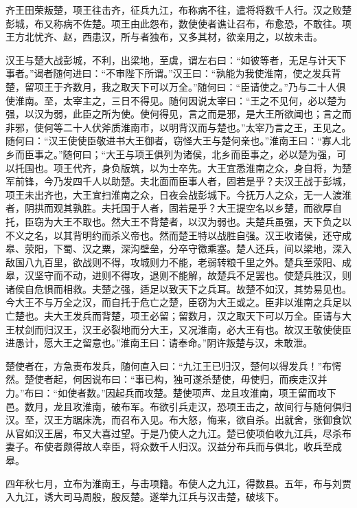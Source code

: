 \documentclass[]{article}
\begin{document}
齐王田荣叛楚，项王往击齐，征兵九江，布称病不往，遣将将数千人行。汉之败楚彭城，布又称病不佐楚。项王由此怨布，数使使者谯让召布，布愈恐，不敢往。项王方北忧齐、赵，西患汉，所与者独布，又多其材，欲亲用之，以故未击。

汉王与楚大战彭城，不利，出梁地，至虞，谓左右曰：``如彼等者，无足与计天下事者。''谒者随何进曰：``不审陛下所谓。''汉王曰：``孰能为我使淮南，使之发兵背楚，留项王于齐数月，我之取天下可以万全。''随何曰：``臣请使之。''乃与二十人俱使淮南。至，太宰主之，三日不得见。随何因说太宰曰：``王之不见何，必以楚为强，以汉为弱，此臣之所为使。使何得见，言之而是邪，是大王所欲闻也；言之而非邪，使何等二十人伏斧质淮南市，以明背汉而与楚也。''太宰乃言之王，王见之。随何曰：``汉王使使臣敬进书大王御者，窃怪大王与楚何亲也。''淮南王曰：``寡人北乡而臣事之。''随何曰；``大王与项王俱列为诸侯，北乡而臣事之，必以楚为强，可以托国也。项王代齐，身负版筑，以为士卒先。大王宜悉淮南之众，身自将，为楚军前锋，今乃发四千人以助楚。夫北面而臣事人者，固若是乎？夫汉王战于彭城，项王未出齐也，大王宜扫淮南之众，日夜会战彭城下。今抚万人之众，无一人渡淮者，阴拱而观其孰胜。夫托国于人者，固若是乎？大王提空名以乡楚，而欲厚自托，臣窃为大王不取也。然大王不背楚者，以汉为弱也。夫楚兵虽强，天下负之以不义之名，以其背明约而杀义帝也。然而楚王特以战胜自强。汉王收诸侯，还守成皋、荥阳，下蜀、汉之粟，深沟壁垒，分卒守徼乘塞。楚人还兵，间以梁地，深入敌国八九百里，欲战则不得，攻城则力不能，老弱转粮千里之外。楚兵至荥阳、成皋，汉坚守而不动，进则不得攻，退则不能解，故楚兵不足罢也。使楚兵胜汉，则诸侯自危惧而相救。夫楚之强，适足以致天下之兵耳。故楚不如汉，其势易见也。今大王不与万全之汉，而自托于危亡之楚，臣窃为大王或之。臣非以淮南之兵足以亡楚也。夫大王发兵而背楚，项王必留；留数月，汉之取天下可以万全。臣请与大王杖剑而归汉王，汉王必裂地而分大王，又况淮南，必大王有也。故汉王敬使使臣进愚计，愿大王之留意也。''淮南王曰：请奉命。''阴许叛楚与汉，未敢泄。

楚使者在，方急责布发兵，随何直入曰：``九江王已归汉，楚何以得发兵！''布愕然。楚使者起，何因说布曰：``事已构，独可遂杀楚使，毋使归，而疾走汉并力。''布曰：``如使者数。''因起兵而攻楚。楚使项声、龙且攻淮南，项王留而攻下邑。数月，龙且攻淮南，破布军。布欲引兵走汉，恐项王击之，故间行与随何俱归汉。至，汉王方踞床洗，而召布入见。布大怒，悔来，欲自杀。出就舍，张御食饮从官如汉王居，布又大喜过望。于是乃使人之九江。楚已使项伯收九江兵，尽杀布妻子。布使者颇得故人幸臣，将众数千人归汉。汉益分布兵而与俱北，收兵至成皋。

四年秋七月，立布为淮南王，与击项籍。布使人之九江，得数县。五年，布与刘贾入九江，诱大司马周殷，殷反楚。遂举九江兵与汉击楚，破垓下。
\end{document}
